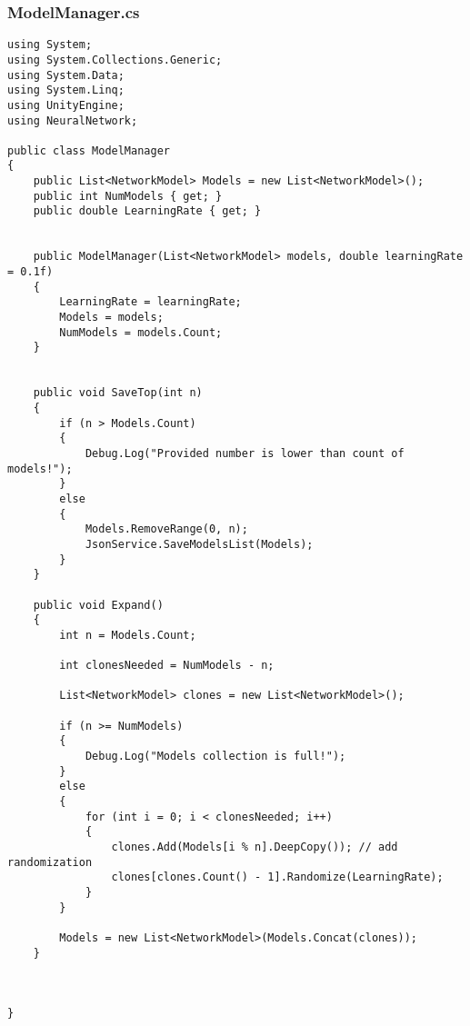 \documentclass[12pt,a4paper]{article}
\begin{document}
\subsubsection*{ModelManager.cs}
\begin{lstlisting}
using System;
using System.Collections.Generic;
using System.Data;
using System.Linq;
using UnityEngine;
using NeuralNetwork;

public class ModelManager
{
    public List<NetworkModel> Models = new List<NetworkModel>();
    public int NumModels { get; }
    public double LearningRate { get; }


    public ModelManager(List<NetworkModel> models, double learningRate = 0.1f)
    {
        LearningRate = learningRate;
        Models = models;
        NumModels = models.Count;
    }


    public void SaveTop(int n)
    {
        if (n > Models.Count)
        {
            Debug.Log("Provided number is lower than count of models!");
        }
        else
        {
            Models.RemoveRange(0, n);
            JsonService.SaveModelsList(Models);
        }
    }

    public void Expand()
    {
        int n = Models.Count;

        int clonesNeeded = NumModels - n;

        List<NetworkModel> clones = new List<NetworkModel>();

        if (n >= NumModels)
        {
            Debug.Log("Models collection is full!");
        }
        else
        {
            for (int i = 0; i < clonesNeeded; i++)
            {
                clones.Add(Models[i % n].DeepCopy()); // add randomization 
                clones[clones.Count() - 1].Randomize(LearningRate);
            }
        }

        Models = new List<NetworkModel>(Models.Concat(clones));
    }



}
\end{lstlisting}
\pagebreak
\end{document}
